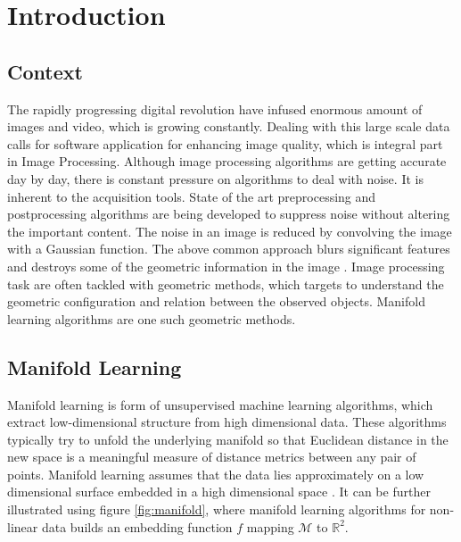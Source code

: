 \chapter{Introduction} %

\label{Chapter1} %


\section{Context}
\label{context}
The rapidly progressing digital revolution have infused enormous amount of images and video, which is growing constantly. Dealing with this large scale data calls for software application for enhancing image quality, which is integral part in Image Processing. Although image processing algorithms are getting accurate day by day, there is constant pressure on algorithms to deal with noise. It is inherent to the acquisition tools. State of the art preprocessing and postprocessing algorithms are being developed to suppress noise without altering the important content. The noise in an image is reduced by convolving the image with a Gaussian function. The above common approach blurs significant features and destroys some of the geometric information in the image \citep{Thor2009}. Image processing task are often tackled with geometric methods, which targets to understand the geometric configuration and relation between the observed objects. Manifold learning algorithms are one such geometric methods.

\section{Manifold Learning}
Manifold learning is form of unsupervised machine learning algorithms, which  extract low-dimensional structure from high dimensional data. These algorithms typically try to unfold the underlying manifold so that Euclidean distance in the new space is a meaningful measure of distance metrics between any pair of points. Manifold learning assumes that the data lies approximately on a low dimensional surface embedded in a high dimensional space \citep{Tal2008}. It can be further illustrated  using figure \ref{fig:manifold}, where manifold learning algorithms for non-linear data builds an embedding function $f$ mapping $\mathcal{M}$ to $\mathbb{R}^2$.

